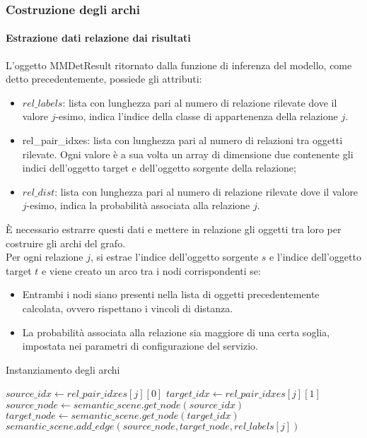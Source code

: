 \subsubsection{Costruzione degli archi}

\paragraph{Estrazione dati relazione dai risultati}
L'oggetto MMDetResult ritornato dalla funzione di inferenza del modello, come detto precedentemente, possiede gli attributi:
\begin{itemize}
	\item $rel\_labels$: lista con lunghezza pari al numero di relazione rilevate dove il valore $j$-esimo, indica l'indice della classe di appartenenza della relazione $j$.
	\item rel\_pair\_idxes: lista con lunghezza pari al numero di relazioni tra oggetti rilevate. Ogni valore è a sua volta un array di dimensione due contenente gli indici dell'oggetto target e dell'oggetto sorgente della relazione;
	\item $rel\_dist$: lista con lunghezza pari al numero di relazione rilevate dove il valore $j$-esimo, indica la probabilità associata alla relazione $j$.
\end{itemize}
È necessario estrarre questi dati e mettere in relazione gli oggetti tra loro per costruire gli archi del grafo.\\
Per ogni relazione $j$, si estrae l'indice dell'oggetto sorgente $s$ e l'indice dell'oggetto target $t$ e viene creato un arco tra i nodi corrispondenti se:
\begin{itemize}
	\item Entrambi i nodi siano presenti nella lista di oggetti precedentemente calcolata, ovvero rispettano i vincoli di distanza.
	\item La probabilità associata alla relazione sia maggiore di una certa soglia, impostata nei parametri di configurazione del servizio.
\end{itemize}

\begin{algorithm}
	\caption{Instanziamento degli archi}
	\begin{algorithmic}[1]
		\State $source\_idx \gets rel\_pair\_idxes[j][0]$
		\State $target\_idx \gets rel\_pair\_idxes[j][1]$
		\State $source\_node \gets semantic\_scene.get\_node(source\_idx)$
		\State $target\_node \gets semantic\_scene.get\_node(target\_idx)$
		\State $semantic\_scene.add\_edge(source\_node, target\_node, rel\_labels[j])$
		\EndIf
		\EndIf
		\EndFor
	\end{algorithmic}
\end{algorithm}

